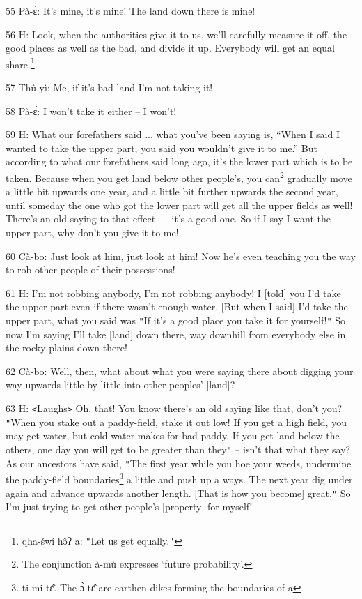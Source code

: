 {55 Pà-ɛ́: It's mine, it's mine! The land down there is mine!

56 H: Look, when the authorities give it to us, we'll carefully measure it off,
the good places as well as the bad, and divide it up. Everybody will get an equal
share.\footnote{qha-šwí hə̂ʔ a: \texttt{"}Let us get equally.\texttt{"}}

57 Thû-yì: Me, if it's bad land I'm not taking it!

58 Pà-ɛ́: I won't take it either -- I won't!

59 H: What our forefathers said ... what you've been saying is, ``When I said I
wanted to take the upper part, you said you wouldn't give it to me.'' But according
to what our forefathers said long ago, it's the lower part which is to be taken.
Because when you get land below other people's, you can\footnote{The conjunction à-mù expresses `future probability'.} gradually move a little
bit upwards one year, and a little bit further upwards the second year, until someday
the one who got the lower part will get all the upper fields as well! There's an
old saying to that effect --- it's a good one. So if I say I want the upper part,
why don't you give it to me!

60 Cà-bo: Just look at him, just look at him! Now he's even teaching you the way
to rob other people of their possessions!

61 H: I'm not robbing anybody, I'm not robbing anybody! I [told] you I'd take the
upper part even if there wasn't enough water. [But when I said] I'd take the upper
part, what you said was \texttt{"}If it's a good place you take it for yourself!\texttt{"}
So now I'm saying I'll take [land] down there, way downhill from everybody else
in the rocky plains down there!

62 Cà-bo: Well, then, what about what you were saying there about digging your
way upwards little by little into other peoples' [land]?

63 H: \texttt{<}Laughs\texttt{>} Oh, that! You know there's an old saying like
that, don't you? \texttt{"}When you stake out a paddy-field, stake it out low!
If you get a high field, you may get water, but cold water makes for bad paddy.
If you get land below the others, one day you will get to be greater than they\texttt{"}
-- isn't that what they say? As our ancestors have said, \texttt{"}The first year
while you hoe your weeds, undermine the paddy-field boundaries\footnote{ti-mi-tɛ̂. The ɔ̀-tɛ̂ are earthen dikes forming the boundaries of a} a little and
push up a ways. The next year dig under again and advance upwards another length.
[That is how you become] great.\texttt{"} So I'm just trying to get other people's
[property] for myself!

}
